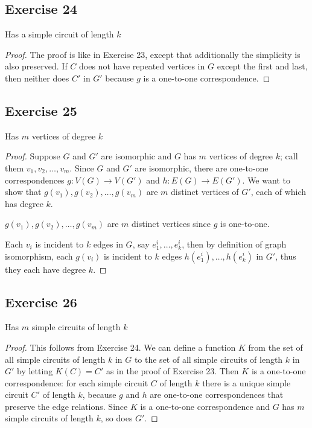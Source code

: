 \documentclass[14pt]{extarticle}
\begin{document}
\subsection{Exercise 24}
Has a simple circuit of length \(k\)

\begin{proof}
The proof is like in Exercise 23, except that additionally the simplicity is also preserved. If \(C\) does not have repeated
vertices in \(G\) except the first and last, then neither does \(C'\) in \(G'\) because \(g\) is a one-to-one correspondence.
\end{proof}

\subsection{Exercise 25}
Has \(m\) vertices of degree \(k\)

\begin{proof}
Suppose \(G\) and \(G'\) are isomorphic and \(G\) has \(m\) vertices of degree \(k\); call them \(v_1, v_2, \ldots, v_m\). 
Since \(G\) and \(G'\) are isomorphic, there are one-to-one correspondences \(g: V(G)\to V(G')\) and \(h: E(G)\to E(G')\). 
We want to show that \(g(v_1), g(v_2), \ldots, g(v_m)\) are \(m\) distinct vertices of \(G'\), each of which has degree \(k\).

\(g(v_1), g(v_2), \ldots, g(v_m)\) are \(m\) distinct vertices since \(g\) is one-to-one.

Each \(v_i\) is incident to \(k\) edges in \(G\), say \(e_1^i, \ldots, e_k^i\), then by definition of graph isomorphism, each
\(g(v_i)\) is incident to \(k\) edges \(h(e_1^i), \ldots, h(e_k^i)\) in \(G'\), thus they each have degree \(k\).
\end{proof}

\subsection{Exercise 26}
Has \(m\) simple circuits of length \(k\)

\begin{proof}
This follows from Exercise 24. We can define a function \(K\) from the set of all simple circuits of length \(k\) in \(G\)
to the set of all simple circuits of length \(k\) in \(G'\) by letting \(K(C) = C'\) as in the proof of Exercise 23. Then 
\(K\) is a one-to-one correspondence: for each simple circuit \(C\) of length \(k\) there is a unique simple circuit \(C'\) 
of length \(k\), because \(g\) and \(h\) are one-to-one correspondences that preserve the edge relations. Since \(K\)
is a one-to-one correspondence and \(G\) has \(m\) simple circuits of length \(k\), so does \(G'\).
\end{proof}
\end{document}
